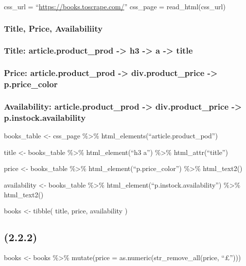 \documentclass[
]{article}
\begin{document}
css\_url = ``\url{https://books.toscrape.com/}'' css\_page =
read\_html(css\_url)

\subsubsection{Title, Price,
Availabiliity}\label{title-price-availabiliity}

\subsubsection{Title: article.product\_prod -\textgreater{} h3
-\textgreater{} a -\textgreater{}
title}\label{title-article.product_prod---h3---a---title}

\subsubsection{Price: article.product\_prod -\textgreater{}
div.product\_price -\textgreater{}
p.price\_color}\label{price-article.product_prod---div.product_price---p.price_color}

\subsubsection{Availability: article.product\_prod -\textgreater{}
div.product\_price -\textgreater{}
p.instock.availability}\label{availability-article.product_prod---div.product_price---p.instock.availability}

books\_table \textless- css\_page \%\textgreater\%
html\_elements(``article.product\_pod'')

title \textless- books\_table \%\textgreater\% html\_element(``h3 a'')
\%\textgreater\% html\_attr(``title'')

price \textless- books\_table \%\textgreater\%
html\_element(``p.price\_color'') \%\textgreater\% html\_text2()

availability \textless- books\_table \%\textgreater\%
html\_element(``p.instock.availability'') \%\textgreater\% html\_text2()

books \textless- tibble( title, price, availability )

\subsection{(2.2.2)}\label{section-2}

books \textless- books \%\textgreater\% mutate(price =
as.numeric(str\_remove\_all(price, ``£'')))
\end{document}
